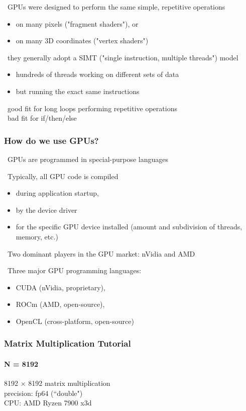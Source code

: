 \documentclass[12pt]{article}
\begin{document}
\textbullet\ GPUs were designed to perform the same simple, repetitive operations
\begin{itemize}
    \item on many pixels ("fragment shaders"), or
    \item on many 3D coordinates ("vertex shaders")
\end{itemize}
\textbullet\ they generally adopt a SIMT ("single instruction, multiple threads") model
\begin{itemize}
    \item hundreds of threads working on different sets of data
    \item but running the exact same instructions
\end{itemize}
\textbullet\ good fit for long loops performing repetitive operations \\
\textbullet\ bad fit for if/then/else

\subsubsection{How do we use GPUs?}

\textbullet\ GPUs are programmed in special-purpose languages

\textbullet\ Typically, all GPU code is compiled
\begin{itemize}
    \item during application startup,
    \item by the device driver
    \item for the specific GPU device installed (amount and subdivision of threads, memory, etc.)
\end{itemize}

\textbullet\ Two dominant players in the GPU market: nVidia and AMD

\textbullet\ Three major GPU programming languages:
\begin{itemize}
    \item CUDA (nVidia, proprietary),
    \item ROCm (AMD, open-source),
    \item OpenCL (cross-platform, open-source)
\end{itemize}
\subsubsection{Matrix Multiplication Tutorial}

\paragraph{N = 8192}
8192 $\times$ 8192 matrix multiplication \\
precision: fp64 (``double") \\
CPU: AMD Ryzen 7900 x3d
\end{document}
